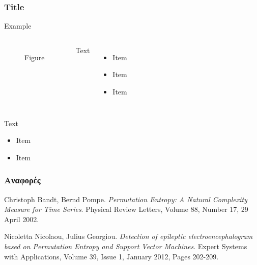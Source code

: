 \documentclass{beamer}
\begin{document}
\begin{frame}
\frametitle{Title}

\begin{exampleblock}{Example}
\begin{columns}
\begin{figure}
Figure
\end{figure}

Text
\begin{itemize}
\item Item
\item Item
\item Item
\end{itemize}

\end{columns}
\end{exampleblock} 

\vspace{0.1cm}
Text
\begin{itemize}
\item Item
\item Item
\end{itemize}

\end{frame}


\begin{frame}
\frametitle{Αναφορές}



\begin{thebibliography}{9}
Christoph Bandt, Bernd Pompe.
\textit{Permutation Entropy: A Natural Complexity Measure for Time Series}. 
Physical Review Letters, Volume 88, Number 17, 29 April 2002.

Nicoletta Nicolaou, Julius Georgiou.
\textit{Detection of epileptic electroencephalogram based on Permutation Entropy and
Support Vector Machines}. 
Expert Systems with Applications, Volume 39, Issue 1, January 2012, Pages 202-209.
 
\end{thebibliography}
\end{frame}
\end{document}
